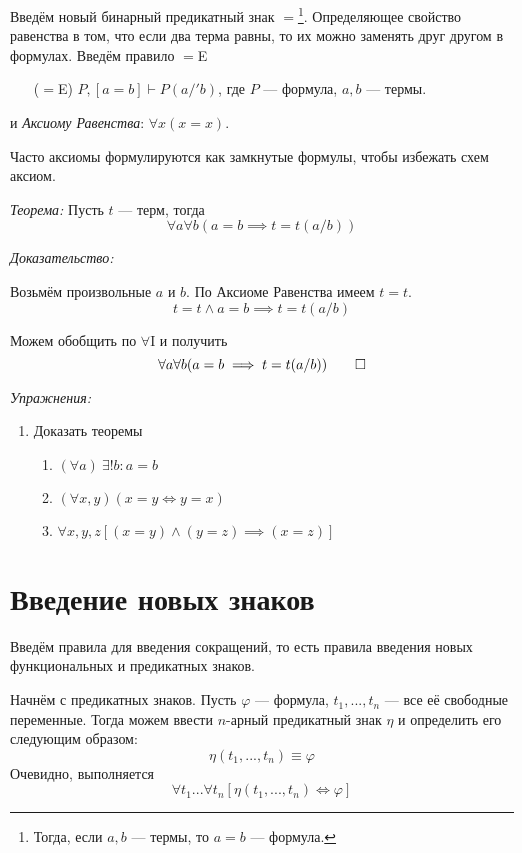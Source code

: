 Введём новый бинарный предикатный знак $=$\footnote{
	Тогда, если $a,b$	 --- термы, то $a=b$ --- формула.
}.
Определяющее свойство равенства в том, что если два терма равны, то их можно
заменять друг другом в формулах. Введём правило $=$E
\begin{enumerate}
	\item[($=$E)]{}$P,[a=b]\vdash P(a/'b)$,
	где $P$ --- формула, $a,b$ --- термы.
\end{enumerate}
и {\it Аксиому Равенства}: $\forall x(x=x)$.

Часто аксиомы формулируются как замкнутые формулы, чтобы избежать схем аксиом.

\vspace{1em}
{\it Теорема:} Пусть $t$ --- терм, тогда
\[
	\forall a\forall b(a=b\implies t=t(a/b))
\]

{\it Доказательство:}

Возьмём произвольные $a$ и $b$. По Аксиоме Равенства имеем $t=t$.
\[
	t=t\land a=b\implies t=t(a/b)
\]

Можем обобщить по $\forall$I и получить
\[
	\forall a\forall b(a=b\implies t=t(a/b))
	\qed
\]


\vspace{1em}
{\it Упражнения:}
\begin{enumerate}
	\item{}Доказать теоремы
	\begin{enumerate}
		\item{}$(\forall a)~\exists! b:a=b$
		\item{}$(\forall x,y)(x=y\iff y=x)$
		\item{}$\forall x,y,z[(x=y)\land (y=z)\implies (x=z)]$
	\end{enumerate}
\end{enumerate}

\section{Введение новых знаков}

Введём правила для введения сокращений, то есть правила введения новых функциональных
и предикатных знаков.

Начнём с предикатных знаков. Пусть $\varphi$ --- формула, $t_1,...,t_{n}$ --- все её
свободные переменные. Тогда можем ввести $n$-арный предикатный знак $\eta$
и определить его следующим образом:
\[
	\eta(t_1,...,t_{n})\equiv \varphi
\]
Очевидно, выполняется
\[
	\forall t_1...\forall t_{n}[\eta(t_1,...,t_{n})\iff\varphi]
\]

